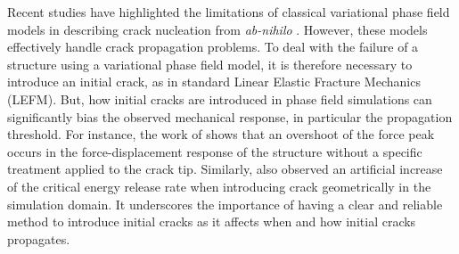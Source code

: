 \documentclass[OptSoft]{jtcam_preprint}
\newcommand{\added}[1]{{\color{red} #1}}
\newcommand{\deleted}[1]{{\itshape\color{lightgray} #1}}
\newcommand{\replaced}[2]{\added{#1} \deleted{#2}}
\begin{document}

Recent studies have highlighted the limitations of classical variational phase field models in describing crack nucleation from \emph{ab-nihilo} \parencite{kumar_revisiting_2020, bazant_critical_2022, lopez-pamies_classical_2024}.
However, these models effectively handle crack propagation problems.
To deal with the failure of a structure using a variational phase field model, it is therefore necessary to introduce an initial crack, as in standard Linear Elastic Fracture Mechanics (LEFM).
But, how initial cracks are introduced in phase field simulations can significantly bias the observed mechanical response, in particular the propagation threshold.
For instance, the work of \textcite{singh_fracture-controlled_2016} shows that an overshoot of the force peak occurs in the force-displacement response of the structure without a specific treatment applied to the crack tip.
Similarly, \textcite{kristensen_assessment_2021} also observed an artificial increase of the critical energy release rate when introducing crack geometrically in the simulation domain.
It underscores the importance of having a clear and reliable method to introduce initial cracks as it affects when and how initial cracks propagates.
\end{document}

